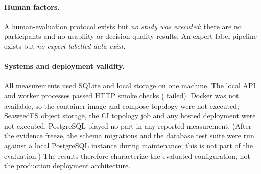 \paragraph{Human factors.} A human-evaluation protocol exists but \emph{no study was
executed}: there are no participants and no usability or decision-quality results. An
expert-label pipeline exists but \emph{no expert-labelled data exist}.

\paragraph{Systems and deployment validity.} All measurements used SQLite and local
storage on one machine. The local API and worker processes passed  HTTP
smoke checks ( failed). Docker was not available, so the container image
and compose topology were not executed; SeaweedFS object storage, the CI topology job
and any hosted deployment were not executed. PostgreSQL played no part in any reported
measurement. (After the evidence freeze, the schema migrations and the database test
suite were run against a local PostgreSQL instance during maintenance; this is not
part of the evaluation.) The results therefore characterize the evaluated
configuration, not the production deployment architecture.
